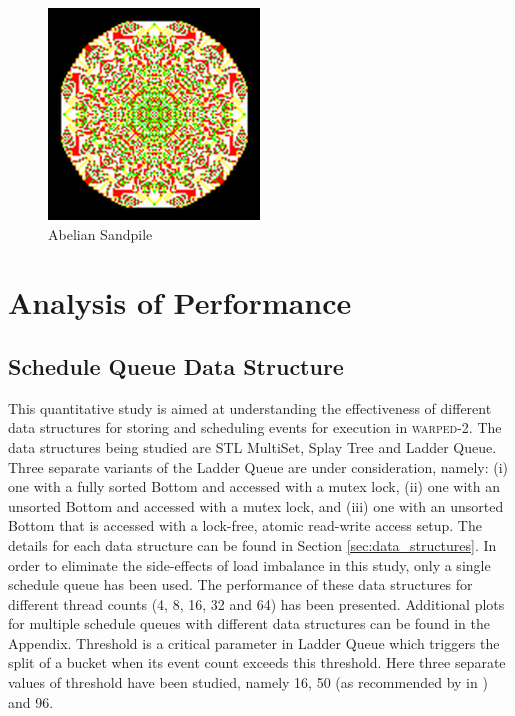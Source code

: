 \documentclass[11pt]{book}
\begin{document}
\begin{figure}
    \centering
    \includegraphics[width=0.5\textwidth]{figures/sandpile.pdf}
    \caption{Abelian Sandpile}\label{fig:sandpile}
\end{figure}


\section{Analysis of Performance}\label{sec:perf_analysis}

\subsection{Schedule Queue Data Structure}\label{subsec:scheduleq_type_plot}

This quantitative study is aimed at understanding the effectiveness of different data structures for storing
and scheduling events for execution in \textsc{warped-2}. The data structures being studied are STL MultiSet,
Splay Tree and Ladder Queue. Three separate variants of the Ladder Queue are under consideration, namely: (i)
one with a fully sorted Bottom and accessed with a mutex lock, (ii) one with an unsorted Bottom and accessed
with a mutex lock, and (iii) one with an unsorted Bottom that is accessed with a lock-free, atomic read-write
access setup.  The details for each data structure can be found in Section \ref{sec:data_structures}. In order
to eliminate the side-effects of load imbalance in this study, only a single schedule queue has been used. The
performance of these data structures for different thread counts (4, 8, 16, 32 and 64) has been
presented. Additional plots for multiple schedule queues with different data structures can be found in the
Appendix. Threshold is a critical parameter in Ladder Queue which triggers the split of a bucket when its
event count exceeds this threshold. Here three separate values of threshold have been studied, namely 16, 50
(as recommended by in \cite{tang-05}) and 96.
\end{document}
